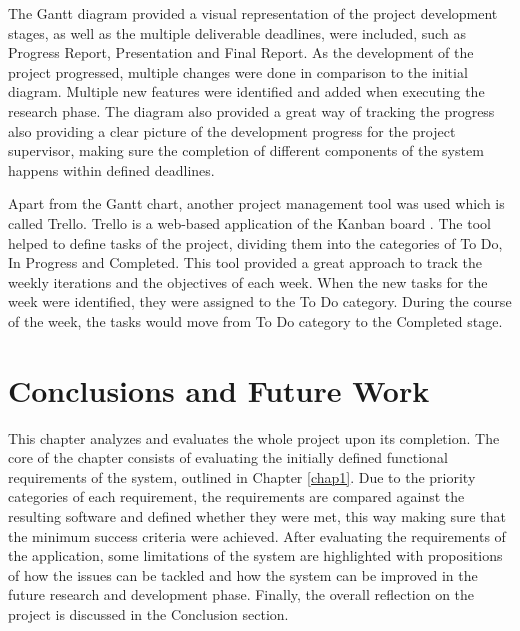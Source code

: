 \documentclass[10pt]{report}
\begin{document}
The Gantt diagram provided a visual representation of the project development stages, as well as the multiple deliverable deadlines, were included, such as Progress Report, Presentation and Final Report. As the development of the project progressed, multiple changes were done in comparison to the initial diagram. Multiple new features were identified and added when executing the research phase. The diagram also provided a great way of tracking the progress also providing a clear picture of the development progress for the project supervisor, making sure the completion of different components of the system happens within defined deadlines.
\newline

Apart from the Gantt chart, another project management tool was used which is called Trello. Trello is a web-based application of the Kanban board \cite{trello}. The tool helped to define tasks of the project, dividing them into the categories of To Do, In Progress and Completed. This tool provided a great approach to track the weekly iterations and the objectives of each week. When the new tasks for the week were identified, they were assigned to the To Do category. During the course of the week, the tasks would move from To Do category to the Completed stage.





\chapter{Conclusions and Future Work}

This chapter analyzes and evaluates the whole project upon its completion. The core of the chapter consists of evaluating the initially defined functional requirements of the system, outlined in Chapter \ref{chap1}. Due to the priority categories of each requirement, the requirements are compared against the resulting software and defined whether they were met, this way making sure that the minimum success criteria were achieved. After evaluating the requirements of the application, some limitations of the system are highlighted with propositions of how the issues can be tackled and how the system can be improved in the future research and development phase. Finally, the overall reflection on the project is discussed in the Conclusion section.
\end{document}
